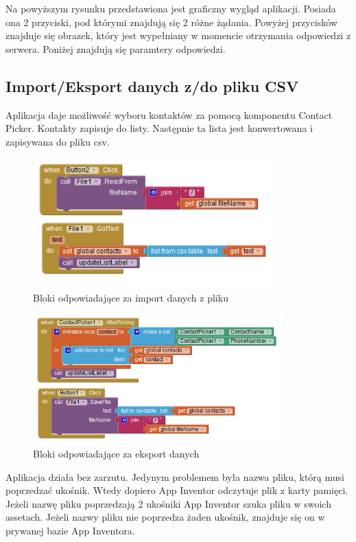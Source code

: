 Na powyższym rysunku przedstawiona jest graficzny wygląd aplikacji. Posiada ona 2 przyciski, pod którymi znajdują się 2 różne żądania. Powyżej przycisków znajduje się obrazek, który jest wypełniany w momencie otrzymania odpowiedzi z serwera. Poniżej znajdują się paramtery odpowiedzi.

\subsection{Import/Eksport danych z/do pliku CSV}

Aplikacja daje możliwość wyboru kontaktów za pomocą komponentu Contact Picker. Kontakty zapisuje do listy. Następnie ta lista jest konwertowana i zapisywana do pliku csv.

\begin{figure}[H]
\centering\includegraphics[height=5cm]{figures/import}
\caption{Bloki odpowiadające za import danych z pliku}
\end{figure}

\begin{figure}[H]
\centering\includegraphics[height=5cm]{figures/export}
\caption{Bloki odpowiadające za eksport danych}
\end{figure}

Aplikacja działa bez zarzutu. Jedynym problemem była nazwa pliku, którą musi poprzedzać ukośnik. Wtedy dopiero App Inventor odczytuje plik z karty pamięci. Jeżeli nazwę pliku poprzedzają 2 ukośniki App Inventor szuka pliku w swoich assetach. Jeżeli nazwy pliku nie poprzedza żaden ukośnik, znajduje się on w prywanej bazie App Inventora.

